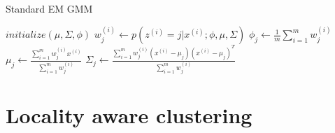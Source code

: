 \documentclass[10pt,a4paper]{article}
\begin{document}
\begin{algorithm}
\caption{Standard EM GMM}
\label{std_gmm}
\begin{algorithmic}
\State $initialize(\mu, \Sigma, \phi)$
        \State $w_j^{(i)}\gets p(z^{(i)} = j|x^{(i)}; \phi, \mu, \Sigma)$
    \EndFor
    \State
    \State $\phi_j\gets\frac{1}{m}\sum_{i=1}^{m}w_j^{(i)}$
    \State $\mu_j\gets\frac{\sum_{i=1}^mw_j^{(i)}x^{(i)}}{\sum_{i=1}^mw_j^{(i)}}$
    \State $\Sigma_j\gets\frac{\sum_{i=1}^mw_j^{(i)}(x^{(i)}-\mu_j)(x^{(i)}-\mu_j)^T}{\sum_{i=1}^mw_j^{(i)}}$
\EndFor
\EndFunction
\end{algorithmic}
\end{algorithm}

\section{Locality aware clustering}
\end{document}

